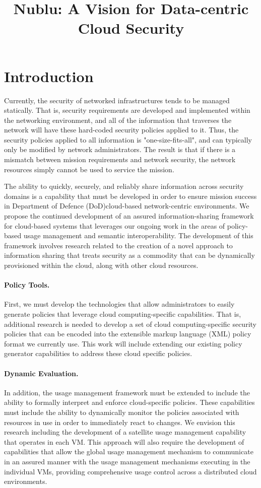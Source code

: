 \documentclass[12pt,letterpaper]{article}
\author{}
\title{Nublu: A Vision for Data-centric Cloud Security}
\begin{document}
\maketitle
\section{Introduction}
\label{sec:intro}
Currently, the security of networked infrastructures tends to be managed statically. That is, security requirements are developed and implemented within the networking environment, and all of the information that traverses the network will have these hard-coded security policies applied to it. Thus, the security policies applied to all information is "one-size-fits-all", and can typically only be modified by network administrators. The result is that if there is a mismatch between mission requirements and network security, the network resources simply cannot be used to service the mission.

The ability to quickly, securely, and reliably share information across security domains is a capability that must be developed in order to ensure mission success in Department of Defence (DoD)cloud-based network-centric environments. We propose the continued development of an assured information-sharing framework for cloud-based systems that leverages our ongoing work in the areas of policy-based usage management and semantic interoperability. The development of this framework involves research related to the creation of a novel approach to information sharing that treats security as a commodity that can be dynamically provisioned within the cloud, along with other cloud resources.

\paragraph{Policy Tools.} First, we must develop the technologies that allow administrators to easily generate policies that leverage cloud computing-specific capabilities. That is, additional research is needed to develop a set of cloud computing-specific security policies that can be encoded into the extensible markup language (XML) policy format we currently use. This work will include extending our existing policy generator capabilities to address these cloud specific policies.

\paragraph{Dynamic Evaluation.} In addition, the usage management framework must be extended to include the ability to formally interpret and enforce cloud-specific policies. These capabilities must include the ability to dynamically monitor the policies associated with resources in use in order to immediately react to changes. We envision this research including the development of a satellite usage management capability that operates in each VM. This approach will also require the development of capabilities that allow the global usage management mechanism to communicate in an assured manner with the usage management mechanisms executing in the individual VMs, providing comprehensive usage control across a distributed cloud environments.
\end{document}
